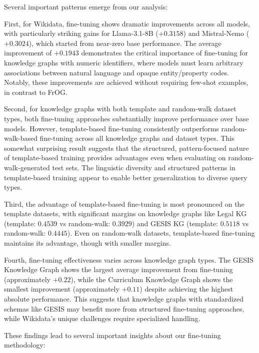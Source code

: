 Several important patterns emerge from our analysis:

First, for Wikidata, fine-tuning shows dramatic improvements across all models, with particularly striking gains for Llama-3.1-8B ($+0.3158$) and Mistral-Nemo ($+0.3024$), which started from near-zero base performance. The average improvement of $+0.1943$ demonstrates the critical importance of fine-tuning for knowledge graphs with numeric identifiers, where models must learn arbitrary associations between natural language and opaque entity/property codes. Notably, these improvements are achieved without requiring few-shot examples, in contrast to FrOG.

Second, for knowledge graphs with both template and random-walk dataset types, both fine-tuning approaches substantially improve performance over base models. However, template-based fine-tuning consistently outperforms random-walk-based fine-tuning across all knowledge graphs and dataset types. This somewhat surprising result suggests that the structured, pattern-focused nature of template-based training provides advantages even when evaluating on random-walk-generated test sets. The linguistic diversity and structured patterns in template-based training appear to enable better generalization to diverse query types.

Third, the advantage of template-based fine-tuning is most pronounced on the template datasets, with significant margins on knowledge graphs like Legal KG (template: $0.4539$ vs random-walk: $0.3929$) and GESIS KG (template: $0.5118$ vs random-walk: $0.4445$). Even on random-walk datasets, template-based fine-tuning maintains its advantage, though with smaller margins.

Fourth, fine-tuning effectiveness varies across knowledge graph types. The GESIS Knowledge Graph shows the largest average improvement from fine-tuning (approximately $+0.22$), while the Curriculum Knowledge Graph shows the smallest improvement (approximately $+0.11$) despite achieving the highest absolute performance. This suggests that knowledge graphs with standardized schemas like GESIS may benefit more from structured fine-tuning approaches, while Wikidata's unique challenges require specialized handling.

These findings lead to several important insights about our fine-tuning methodology:

